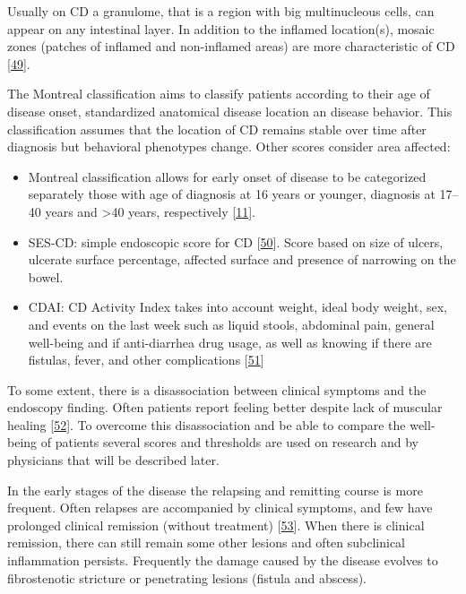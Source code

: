 \documentclass[
  a4paper,
]{book}
\providecommand{\tightlist}{%
  \setlength{\itemsep}{0pt}\setlength{\parskip}{0pt}}
\begin{document}
Usually on CD a granulome, that is a region with big multinucleous cells, can appear on any intestinal layer.
In addition to the inflamed location(s), mosaic zones (patches of inflamed and non-inflamed areas) are more characteristic of CD {[}\protect\hyperlink{ref-bassolasmolina2018}{49}{]}.

The Montreal classification aims to classify patients according to their age of disease onset, standardized anatomical disease location an disease behavior.
This classification assumes that the location of CD remains stable over time after diagnosis but behavioral phenotypes change.
Other scores consider area affected:

\begin{itemize}
\tightlist
\item
  Montreal classification allows for early onset of disease to be categorized separately those with age of diagnosis at 16 years or younger, diagnosis at 17--40 years and \textgreater40 years, respectively {[}\protect\hyperlink{ref-satsangi2006}{11}{]}.
\item
  SES-CD: simple endoscopic score for CD {[}\protect\hyperlink{ref-daperno2004}{50}{]}. Score based on size of ulcers, ulcerate surface percentage, affected surface and presence of narrowing on the bowel.
\item
  CDAI: CD Activity Index takes into account weight, ideal body weight, sex, and events on the last week such as liquid stools, abdominal pain, general well-being and if anti-diarrhea drug usage, as well as knowing if there are fistulas, fever, and other complications {[}\protect\hyperlink{ref-best1976}{51}{]}
\end{itemize}

To some extent, there is a disassociation between clinical symptoms and the endoscopy finding.
Often patients report feeling better despite lack of muscular healing {[}\protect\hyperlink{ref-bhattacharya2016}{52}{]}.
To overcome this disassociation and be able to compare the well-being of patients several scores and thresholds are used on research and by physicians that will be described later.

In the early stages of the disease the relapsing and remitting course is more frequent.
Often relapses are accompanied by clinical symptoms, and few have prolonged clinical remission (without treatment) {[}\protect\hyperlink{ref-peyrin-biroulet2010}{53}{]}.
When there is clinical remission, there can still remain some other lesions and often subclinical inflammation persists.
Frequently the damage caused by the disease evolves to fibrostenotic stricture or penetrating lesions (fistula and abscess).
\end{document}
